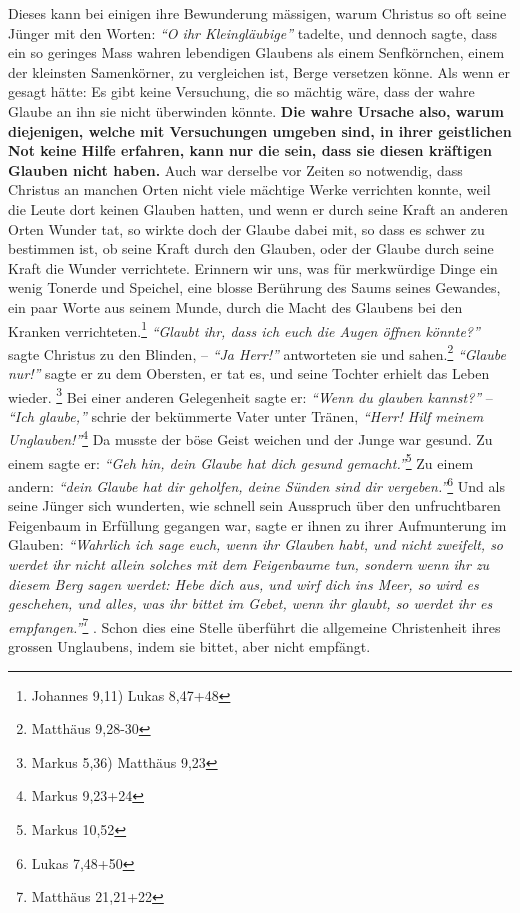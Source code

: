 Dieses kann bei einigen ihre Bewunderung mässigen, warum Christus so oft seine
Jünger mit den Worten:
\textit{"`O ihr Kleingläubige"'} tadelte, und dennoch sagte,
dass ein so geringes Mass wahren lebendigen Glaubens als einem Senfkörnchen,
einem der kleinsten Samenkörner, zu vergleichen ist, Berge versetzen könne. Als
wenn er gesagt hätte: Es gibt keine Versuchung, die so mächtig wäre, dass der
wahre Glaube an ihn sie nicht überwinden könnte. \textbf{Die wahre Ursache also,
warum
diejenigen, welche mit Versuchungen umgeben sind, in ihrer geistlichen Not
keine Hilfe erfahren, kann nur die sein, dass sie diesen kräftigen Glauben nicht
haben.} Auch war derselbe vor Zeiten so notwendig,
dass Christus an manchen
Orten nicht viele mächtige Werke verrichten konnte, weil die Leute dort
keinen Glauben hatten, und wenn er durch seine Kraft an anderen Orten Wunder
tat, so wirkte doch der Glaube dabei mit, so dass es schwer zu bestimmen ist,
ob seine Kraft durch den Glauben, oder der Glaube durch seine Kraft die Wunder
verrichtete. Erinnern wir uns, was für merkwürdige Dinge ein wenig Tonerde und
Speichel, eine blosse Berührung des Saums seines Gewandes, ein paar Worte aus
seinem Munde, durch die Macht des Glaubens bei den Kranken
verrichteten.\footnote{Johannes 9,11) Lukas 8,47+48}
\textit{"`Glaubt ihr, dass ich euch die
Augen öffnen könnte?"'} sagte Christus zu den Blinden, -- \textit{"`Ja Herr!"'}
antworteten
sie und sahen.\footnote{Matthäus 9,28-30}
\textit{"`Glaube nur!"'} sagte er zu dem
Obersten, er tat es, und seine Tochter erhielt das Leben wieder.
\footnote{Markus 5,36) Matthäus 9,23}
Bei einer anderen Gelegenheit sagte er:
\textit{"`Wenn du glauben kannst?"'} --
\textit{"`Ich glaube,"'} schrie der bekümmerte Vater unter Tränen,
\textit{"`Herr! Hilf meinem Unglauben!"'}\footnote{Markus 9,23+24}
Da musste der böse Geist weichen und der
Junge war gesund. Zu einem sagte er:
\textit{"`Geh hin, dein Glaube hat dich gesund gemacht."'}\footnote{Markus
10,52}
Zu einem andern: \textit{"`dein Glaube hat dir
geholfen, deine Sünden sind dir vergeben."'}\footnote{Lukas  7,48+50}
Und als seine
Jünger sich wunderten, wie schnell sein Ausspruch über den unfruchtbaren
Feigenbaum in Erfüllung gegangen war, sagte er ihnen zu ihrer Aufmunterung im
Glauben:
\textit{"`Wahrlich ich sage euch, wenn ihr Glauben habt, und nicht zweifelt,
so werdet ihr nicht allein solches mit dem Feigenbaume tun, sondern wenn ihr zu
diesem Berg sagen werdet: Hebe dich aus, und wirf dich ins Meer, so wird es
geschehen, und alles, was ihr bittet im Gebet, wenn ihr glaubt, so werdet ihr
es empfangen."'}\footnote{Matthäus 21,21+22}
. Schon dies eine Stelle überführt die
allgemeine Christenheit ihres grossen
Unglaubens, indem sie bittet, aber nicht
empfängt.

